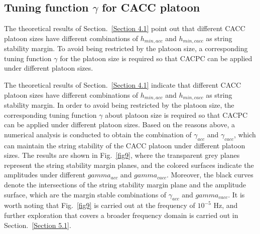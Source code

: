 \documentclass[trsc,nonblindrev]{informs3} %
\begin{document}
\subsection{Tuning function $\gamma$ for CACC platoon}
\label{Section 4.3}

The theoretical results of Section.~\ref{Section 4.1} point out that different CACC platoon sizes have different combinations of $h_{min,acc}$ and $h_{min,cacc}$ as string stability margin. To avoid being restricted by the platoon size, a corresponding tuning function $\gamma$ for the platoon size is required so that CACPC can be applied under different platoon sizes.

The theoretical results of Section.~\ref{Section 4.1} indicate that different CACC platoon sizes have different combinations of $h_{min,acc}$ and $h_{min,cacc}$ as string stability margin. In order to avoid being restricted by the platoon size, the corresponding tuning function $\gamma$ about platoon size is required so that CACPC can be applied under different platoon sizes. Based on the reasons above, a numerical analysis is conducted to obtain the combination of $\gamma_{acc}$ and $\gamma_{cacc}$, which can maintain the string stability of the CACC platoon under different platoon sizes. The results are shown in Fig.~\ref{fig9}, where the transparent grey planes represent the string stability margin planes, and the colored surfaces indicate the amplitudes under different $gamma_{acc}$ and $gamma_{cacc}$. Moreover, the black curves denote the intersections of the string stability margin plane and the amplitude surface, which are the margin stable combinations of $\gamma_{acc}$ and $gamma_{cacc}$. It is worth noting that Fig.~\ref{fig9} is carried out at the frequency of $10^{-5}$ Hz, and further exploration that covers a broader frequency domain is carried out in Section.~\ref{Section 5.1}.
\end{document}

